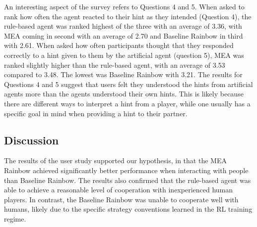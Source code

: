 \documentclass[letterpaper]{article} %
\begin{document}
An interesting aspect of the survey refers to Questions 4 and 5. 
When asked to rank how often the agent reacted to their hint as they intended (Question 4), the rule-based agent was ranked highest of the three with an average of 3.36, with MEA coming in second with an average of 2.70 and Baseline Rainbow in third with 2.61. %
When asked  how often participants thought that they responded correctly to a hint given to them by the artificial agent (question 5), MEA was ranked slightly higher than the rule-based agent, with an average of 3.53 compared to 3.48. The lowest was Baseline Rainbow with 3.21.
The results for Questions 4 and 5 suggest that users felt they understood the  hints from artificial agents more than the agents understood their own hints. This is likely because there are different ways to interpret a hint from a player, while one usually has a specific goal in mind when providing a hint to their partner. 




\subsection{Discussion}

The results of the user study supported our hypothesis, in that the MEA Rainbow achieved significantly better performance when interacting 
with people than Baseline Rainbow. 
The results also confirmed that the rule-based agent was able to achieve a reasonable level of cooperation with inexperienced human players.  In contrast, the Baseline Rainbow was unable to cooperate well with humans, likely due to the specific strategy conventions learned in the RL training regime. 
\end{document}
